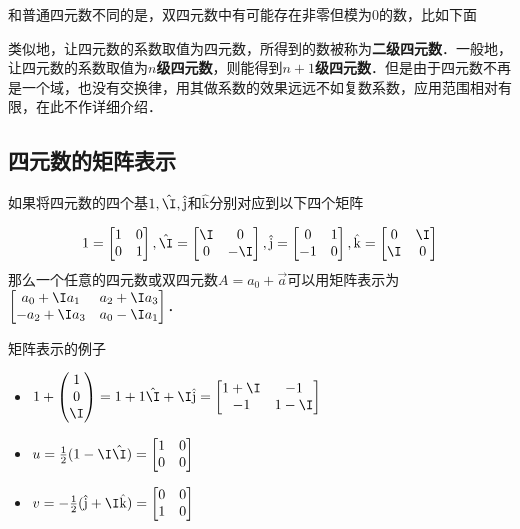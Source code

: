 和普通四元数不同的是，双四元数中有可能存在非零但模为0的数，比如下面

类似地，让四元数的系数取值为四元数，所得到的数被称为\textbf{二级四元数}．一般地，让四元数的系数取值为$n$\textbf{级四元数}，则能得到$n+1$\textbf{级四元数}．但是由于四元数不再是一个域，也没有交换律，用其做系数的效果远远不如复数系数，应用范围相对有限，在此不作详细介绍．


\subsection{四元数的矩阵表示}

如果将四元数的四个基$1, \hat{\I}, \hat{\mathrm{j}}$和$\hat{\mathrm{k}}$分别对应到以下四个矩阵

\begin{equation}

1=\left[\begin{matrix}1&0\\0&1\end{matrix} \right], \hat{\I}=\left[\begin{matrix}\I&0\\0&-\I\end{matrix} \right], \hat{\mathrm{j}}=\left[\begin{matrix}0&1\\-1&0\end{matrix} \right], \hat{\mathrm{k}}=\left[\begin{matrix}0&\I\\\I&0\end{matrix} \right]

\end{equation}
那么一个任意的四元数或双四元数$A=a_0+\vec{a}$可以用矩阵表示为$\left[\begin{matrix}a_0+\I a_1&a_2+\I a_3\\-a_2+\I a_3&a_0-\I a_1 \end{matrix} \right]$．

\begin{example}{矩阵表示的例子}\label{Quat_ex1}
\begin{itemize}
\item $1+\left(\begin{matrix}1\\0\\\I\end{matrix} \right)=1+1\hat{\I}+\I\hat{\mathrm{j}}=\left[\begin{matrix}1+\I&-1\\-1&1-\I\end{matrix} \right]$
\item $u=\frac{1}{2}(1-\I\hat{\I})=\left[\begin{matrix}1&0\\0&0\end{matrix} \right]$
\item $v=-\frac{1}{2}(\hat{\mathrm{j}}+\I\hat{\mathrm{k}})=\left[\begin{matrix}0&0\\1&0\end{matrix} \right]$

\end{itemize}


\end{example}

